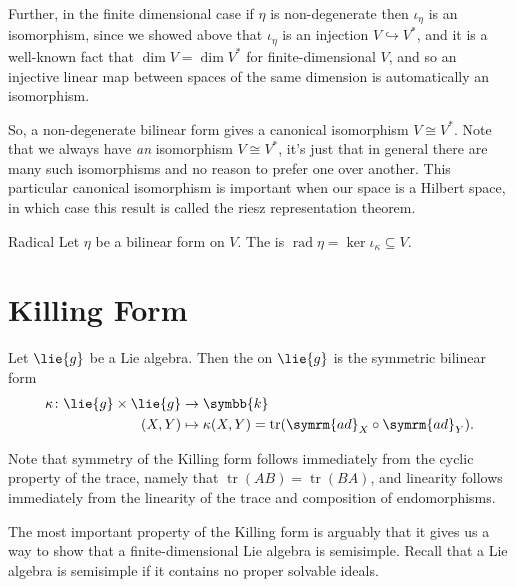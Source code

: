\documentclass[fleqn]{NotesClass}
\renewcommand{\field}{\symbb{k}}
\newcommand{\isomorphic}{\cong}
\DeclareMathOperator{\tr}{tr}
\newcommand{\ad}{\symrm{ad}}
\DeclareMathOperator{\rad}{rad}
\begin{document}
    Further, in the finite dimensional case if \(\eta\) is non-degenerate then \(\iota_\eta\) is an isomorphism, since we showed above that \(\iota_\eta\) is an injection \(V \hookrightarrow V^*\), and it is a well-known fact that \(\dim V = \dim V^*\) for finite-dimensional \(V\), and so an injective linear map between spaces of the same dimension is automatically an isomorphism.
    
    So, a non-degenerate bilinear form gives a canonical isomorphism \(V \isomorphic V^*\).
    Note that we always have \emph{an} isomorphism \(V \isomorphic V^*\), it's just that in general there are many such isomorphisms and no reason to prefer one over another.
    This particular canonical isomorphism is important when our space is a Hilbert space, in which case this result is called the riesz representation theorem.
    
    \begin{dfn}{Radical}{}
        Let \(\eta\) be a bilinear form on \(V\).
        The  is \(\rad \eta = \ker \iota_\kappa \subseteq V\).
    \end{dfn}
    
    \section{Killing Form}
    \begin{dfn}{}{}
        Let \(\lie{g}\) be a Lie algebra.
        Then the  on \(\lie{g}\) is the symmetric bilinear form
        \begin{align}
            \kappa \colon \lie{g} \times \lie{g} &\to \field\\
            (X, Y) &\mapsto \kappa(X, Y) = \tr(\ad_X \circ \ad_Y).
        \end{align}
    \end{dfn}
    
    Note that symmetry of the Killing form follows immediately from the cyclic property of the trace, namely that \(\tr(AB) = \tr(BA)\), and linearity follows immediately from the linearity of the trace and composition of endomorphisms.
    
    The most important property of the Killing form is arguably that it gives us a way to show that a finite-dimensional Lie algebra is semisimple.
    Recall that a Lie algebra is semisimple if it contains no proper solvable ideals.
    
\end{document}
